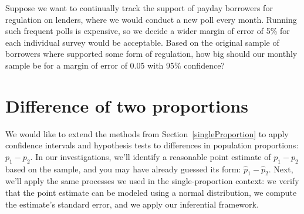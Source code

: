 
\begin{exercisewrap}
\begin{nexercise}
Suppose we want to continually track the support
of payday borrowers for regulation on lenders,
where we would conduct a new poll every month.
Running such frequent polls is expensive, so we decide
a wider margin of error of 5\% for each individual survey
would be acceptable.
Based on the original sample of borrowers where
\paydayRegPerc{} supported some form of regulation,
how big should our monthly sample be for a margin
of error of 0.05 with 95\% confidence?\footnotemark
\end{nexercise}
\end{exercisewrap}


{}





\section{Difference of two proportions}
\label{differenceOfTwoProportions}

We would like to extend the methods from
Section~\ref{singleProportion}
to apply confidence intervals and hypothesis tests
to differences in population proportions:
\mbox{$p_1 - p_2$}.
In our investigations, we'll identify a reasonable
point estimate of $p_1 - p_2$ based on the sample,
and you may have already guessed its form:
$\hat{p}_1 - \hat{p}_2$.
%
Next, we'll apply the same processes we used in
the single-proportion context:
we verify that the point estimate
can be modeled using a normal distribution,
we compute the estimate's standard error, and
we apply our inferential framework.


